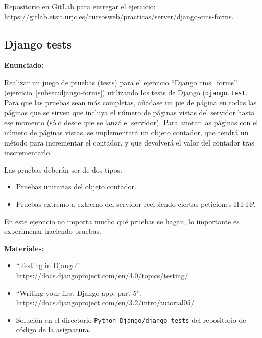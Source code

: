 Repositorio en GitLab para entregar el ejercicio: \\ 
\url{https://gitlab.etsit.urjc.es/cursosweb/practicas/server/django-cms-forms}.


\subsection{Django tests}
\label{subsec:django-tests}

\textbf{Enunciado:}

Realizar un juego de pruebas (tests) para el ejercicio ``Django cms\_forms'' (ejercicio~\ref{subsec:django-forms}) utilizando los tests de Django (\texttt{django.test}. Para que las pruebas sean más completas, añádase un pie de página en todas las páginas que se sirven que incluya el número de páginas vistas del servidor hasta ese momento (sólo desde que se lanzó el servidor). Para anotar las páginas con el número de páginas vistas, se implementará un objeto contador, que tendrá un método para incrementar el contador, y que devolverá el valor del contador tras inscrementarlo.

Las pruebas deberán ser de dos tipos:

\begin{itemize}
\item Pruebas unitarias del objeto contador.
\item Pruebas extremo a extremo del servidor recibiendo ciertas peticiones HTTP.
\end{itemize}

En este ejercicio no importa mucho qué pruebas se hagan, lo importante es experimenar haciendo pruebas.

\textbf{Materiales:}

\begin{itemize}
\item ``Testing in Django'': \\
  \url{https://docs.djangoproject.com/en/4.0/topics/testing/}

\item ``Writing your first Django app, part 5'': \\
\url{https://docs.djangoproject.com/en/3.2/intro/tutorial05/}

\item Solución en el directorio \texttt{Python-Django/django-tests} del repositorio de código de la asignatura.

\end{itemize}

